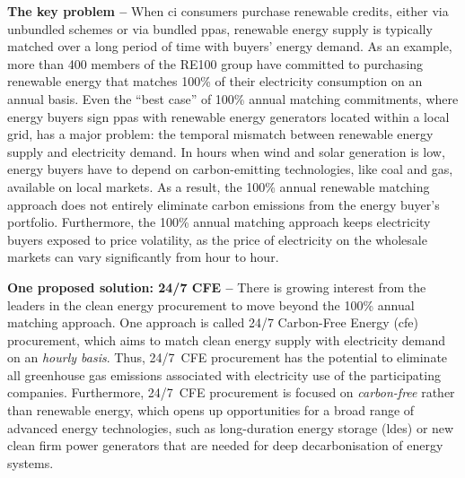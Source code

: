 \documentclass[11pt, 5p, nopreprintline]{elsarticle}
\begin{document}
\textbf{The key problem --} When \gls{ci} consumers purchase renewable credits, either via unbundled schemes or via bundled \gls{ppa}s, renewable energy supply is typically matched over a long period of time with buyers' energy demand.
As an example, more than 400 members of the RE100 group \cite{re100report-2020} have committed to purchasing renewable energy that matches 100\% of their electricity consumption on an annual basis.
Even the \enquote{best case} of 100\% annual matching commitments, where energy buyers sign \gls{ppa}s with renewable energy generators located within a local grid, has a major problem: the temporal mismatch between renewable energy supply and electricity demand.
In hours when wind and solar generation is low, energy buyers have to depend on carbon-emitting technologies, like coal and gas, available on local markets.
As a result, the 100\% annual renewable matching approach does not entirely eliminate carbon emissions from the energy buyer's portfolio.
Furthermore, the 100\% annual matching approach keeps electricity buyers exposed to price volatility, as the price of electricity on the wholesale markets can vary significantly from hour to hour.


\textbf{One proposed solution: 24/7 CFE --} There is growing interest from the leaders in the clean energy procurement to move beyond the 100\% annual matching approach.
One approach is called 24/7 Carbon-Free Energy (\gls{cfe}) procurement, which aims to match clean energy supply with electricity demand on an \textit{hourly basis}.
Thus, 24/7~CFE procurement has the potential to eliminate all greenhouse gas emissions associated with electricity use of the participating companies.
Furthermore, 24/7~CFE procurement is focused on \textit{carbon-free} rather than renewable energy, which opens up opportunities for a broad range of advanced energy technologies, such as long-duration energy storage (\gls{ldes}) or new clean firm power generators that are needed for deep decarbonisation of energy systems.
\end{document}
